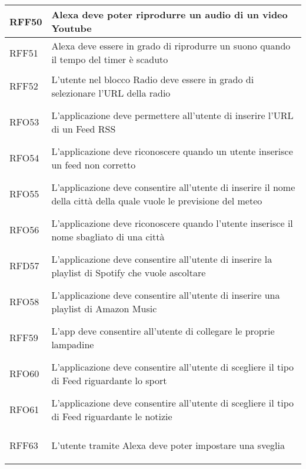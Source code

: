 \begin{longtable}{|>{\centering}m{5em}|m{25em}|}
	\hypertarget{RFF50}{RFF50} & Alexa deve poter riprodurre un audio di un video Youtube\\ \hline
	
	\hypertarget{RFF51}{RFF51} & Alexa deve essere in grado di riprodurre un suono quando il tempo del timer è scaduto\\ \hline
	
	\hypertarget{RFF52}{RFF52} & L'utente nel blocco Radio deve essere in grado di selezionare l'URL della radio\\ \hline
	
	\hypertarget{RFO53}{RFO53} & L'applicazione deve permettere all'utente di inserire l'URL di un Feed RSS\\ \hline
	
	\hypertarget{RFO54}{RFO54} & L'applicazione deve riconoscere quando un utente inserisce un feed non corretto\\ \hline
	
	\hypertarget{RFO55}{RFO55} & L'applicazione deve consentire all'utente di inserire il nome della città della quale vuole le previsione del meteo\\ \hline
	
	\hypertarget{RFO56}{RFO56} & L'applicazione deve riconoscere quando l'utente inserisce il nome sbagliato di una città\\ \hline
	
	\hypertarget{RFD57}{RFD57} & L'applicazione deve consentire all'utente di inserire la playlist di Spotify che vuole ascoltare\\ \hline
	
	\hypertarget{RFO58}{RFO58} & L'applicazione deve consentire all'utente di inserire una playlist di Amazon Music\\ \hline
	
	\hypertarget{RFF59}{RFF59} & L'app deve consentire all'utente di collegare le proprie lampadine\\ \hline
	
	\hypertarget{RFO60}{RFO60} & L'applicazione deve consentire all'utente di scegliere il tipo di Feed riguardante lo sport\\ \hline
	
	\hypertarget{RFO61}{RFO61} & L'applicazione deve consentire all'utente di scegliere il tipo di Feed riguardante le notizie\\ \hline
	
	\hypertarget{RFF63}{RFF63} & L'utente tramite Alexa deve poter impostare una sveglia\\ \hline
	

\end{longtable}

